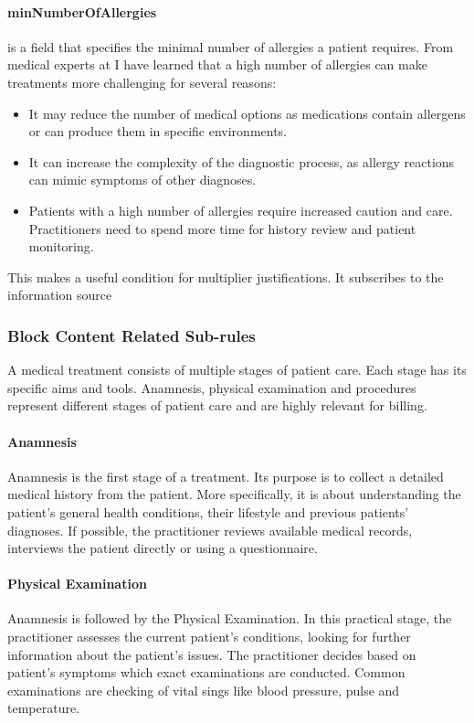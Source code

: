 \paragraph{minNumberOfAllergies}
 is a field that specifies the minimal number of allergies a patient requires.
From medical experts at \AV I have learned that a high number of allergies can make treatments more challenging for several reasons:
\begin{itemize}
    \item It may reduce the number of medical options as medications contain allergens or can produce them in specific environments.
    \item It can increase the complexity of the diagnostic process, as allergy reactions can mimic symptoms of other diagnoses.
    \item Patients with a high number of allergies require increased caution and care.
    Practitioners need to spend more time for history review and patient monitoring.
\end{itemize}
This makes  a useful condition for multiplier justifications.
It subscribes to the information source 

\subsubsection{Block Content Related Sub-rules}

A medical treatment consists of multiple stages of patient care.
Each stage has its specific aims and tools.
Anamnesis,
physical examination and procedures represent different stages of patient care and are highly relevant for billing.

\paragraph{Anamnesis}
Anamnesis is the first stage of a treatment.
Its purpose is to collect a detailed medical history from the patient\cite{lino2021medical}.
More specifically, it is about understanding the patient's general health conditions,
their lifestyle and previous patients' diagnoses.
If possible, the practitioner reviews available medical records,
interviews the patient directly or using a questionnaire\cite{zhang2011anamnevis}.

\paragraph{Physical Examination}
Anamnesis is followed by the Physical Examination.
In this practical stage, the practitioner assesses the current patient's conditions,
looking for further information about the patient's issues\cite{seidel2010mosby}.
The practitioner decides based on patient's symptoms which exact examinations are conducted.
Common examinations are checking of vital sings like blood pressure, pulse and temperature.

